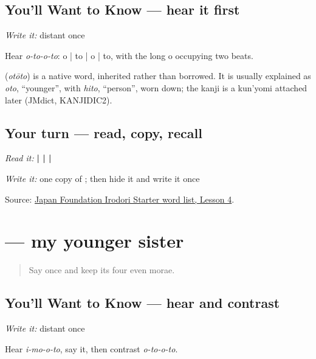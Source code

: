 \subsection*{You'll Want to Know — hear it first}
\emph{Write it:} distant \textbf{} once

Hear \emph{o-to-o-to}: o | to | o | to, with the long o occupying two beats.

\begin{cousinweb}
\textbf{} (\emph{otōto}) is a native word, inherited rather than borrowed. It is usually explained as \emph{oto}, \textquotedblleft{}younger\textquotedblright{}, with \emph{hito}, \textquotedblleft{}person\textquotedblright{}, worn down; the kanji is a kun'yomi attached later (JMdict, KANJIDIC2).
\end{cousinweb}

\subsection*{Your turn — read, copy, recall}
\emph{Read it:} \textbf{ |  |  | }

\emph{Write it:} one copy of \textbf{}; then hide it and write it once

\begin{tcolorbox}[breakable,colback=teal!4,colframe=teal!35!black,title={Before you move on}]
Source: \href{https://www.irodori.jpf.go.jp/assets/data/wordlist\_X.pdf}{Japan Foundation Irodori Starter word list, Lesson 4}.
\end{tcolorbox}
\section[\texorpdfstring{\ja{いもうと} (imooto)}{いもうと (imooto)}]{ — my younger sister}

\label{lesson:JA-C13-imouto}



\begin{quote}
Say \textbf{} once and keep its four even morae.
\end{quote}

\subsection*{You'll Want to Know — hear and contrast}
\emph{Write it:} distant \textbf{} once

Hear \emph{i-mo-o-to}, say it, then contrast \emph{o-to-o-to}.

